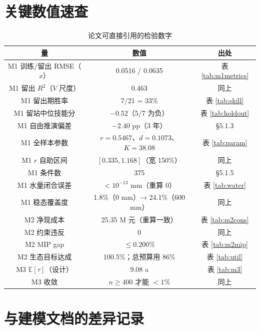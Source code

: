 \documentclass[11pt,a4paper]{ctexart}
\newcommand{\E}{\mathbb{E}}
\begin{document}
\section{关键数值速查}

\begin{longtable}{|c|c|c|}
\caption{论文可直接引用的检验数字}\\
\hline
量 & 数值 & 出处 \\
\hline
\endhead
M1 训练/留出 RMSE（$x$） & 0.0516 / 0.0635 & 表 \ref{tab:m1metrics} \\
M1 留出 $R^2$（$V$ 尺度） & 0.463 & 同上 \\
M1 留出期胜率 & 7/21 = 33\% & 表 \ref{tab:skill} \\
M1 留站中位技能分 & $-0.52$（5/7 为负） & 表 \ref{tab:holdout} \\
M1 自由推演偏差 & $-2.40$ pp（3 年） & \S5.1.3 \\
M1 全样本参数 & $r=0.5467$、$d=0.1073$、$K=38.08$ & 表 \ref{tab:param} \\
M1 $r$ 自助区间 & $[0.335,1.168]$（宽 150\%） & 同上 \\
M1 条件数 & 375 & \S5.1.5 \\
M1 水量闭合误差 & $<10^{-13}$ mm（重算 0） & 表 \ref{tab:water} \\
M1 稳态覆盖度 & 1.8\%（0 mm）→ 24.1\%（600 mm） & 同上 \\
M2 净现成本 & 25.35 M 元（重算一致） & 表 \ref{tab:m2cons} \\
M2 约束违反 & 0 & 同上 \\
M2 MIP gap & $\le0.200\%$ & 表 \ref{tab:m2mip} \\
M2 生态目标达成 & 100.5\%；总预算用 86\% & 表 \ref{tab:util} \\
M3 $\E[\tau]$（设计） & 9.08 a & 表 \ref{tab:m3} \\
M3 收敛 & $n\ge400$ 才能 $<1\%$ & 同上 \\
\hline
\end{longtable}

\section{与建模文档的差异记录}
\end{document}
